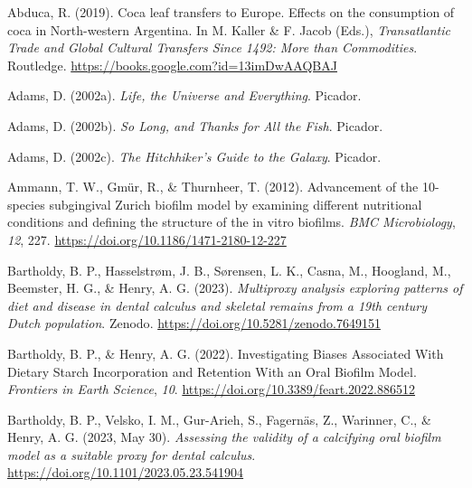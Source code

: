 \documentclass[
  letterpaper,
]{book}
\newlength{\cslhangindent}
\newlength{\cslentryspacingunit} %
\newenvironment{CSLReferences}[2] %
 {%
  \setlength{\parindent}{0pt}
  \ifodd #1
  \let\oldpar\par
  \def\par{\hangindent=\cslhangindent\oldpar}
  \fi
  \setlength{\parskip}{#2\cslentryspacingunit}
 }%
 {}
\begin{document}
\leavevmode{}%
\cleardoublepage
{}
{}
\appendix

\hypertarget{refs-6}{}
\begin{CSLReferences}{1}{0}
\leavevmode{}%
Abduca, R. (2019). Coca leaf transfers to {Europe}. {Effects} on the
consumption of coca in {North-western Argentina}. In M. Kaller \& F.
Jacob (Eds.), \emph{Transatlantic {Trade} and {Global Cultural Transfers
Since} 1492: {More} than {Commodities}}. {Routledge}.
\url{https://books.google.com?id=13imDwAAQBAJ}

\leavevmode{}%
Adams, D. (2002a). \emph{Life, the {Universe} and {Everything}}.
{Picador}.

\leavevmode{}%
Adams, D. (2002b). \emph{So {Long}, and {Thanks} for {All} the {Fish}}.
{Picador}.

\leavevmode{}%
Adams, D. (2002c). \emph{The {Hitchhiker}'s {Guide} to the {Galaxy}}.
{Picador}.

\leavevmode{}%
Ammann, T. W., Gmür, R., \& Thurnheer, T. (2012). Advancement of the
10-species subgingival {Zurich} biofilm model by examining different
nutritional conditions and defining the structure of the in vitro
biofilms. \emph{BMC Microbiology}, \emph{12}, 227.
\url{https://doi.org/10.1186/1471-2180-12-227}

\leavevmode{}%
Bartholdy, B. P., Hasselstrøm, J. B., Sørensen, L. K., Casna, M.,
Hoogland, M., Beemster, H. G., \& Henry, A. G. (2023). \emph{Multiproxy
analysis exploring patterns of diet and disease in dental calculus and
skeletal remains from a 19th century {Dutch} population}. {Zenodo}.
\url{https://doi.org/10.5281/zenodo.7649151}

\leavevmode{}%
Bartholdy, B. P., \& Henry, A. G. (2022). Investigating {Biases
Associated With Dietary Starch Incorporation} and {Retention With} an
{Oral Biofilm Model}. \emph{Frontiers in Earth Science}, \emph{10}.
\url{https://doi.org/10.3389/feart.2022.886512}

\leavevmode{}%
Bartholdy, B. P., Velsko, I. M., Gur-Arieh, S., Fagernäs, Z., Warinner,
C., \& Henry, A. G. (2023, May 30). \emph{Assessing the validity of a
calcifying oral biofilm model as a suitable proxy for dental calculus}.
\url{https://doi.org/10.1101/2023.05.23.541904}


\end{CSLReferences}
\end{document}
